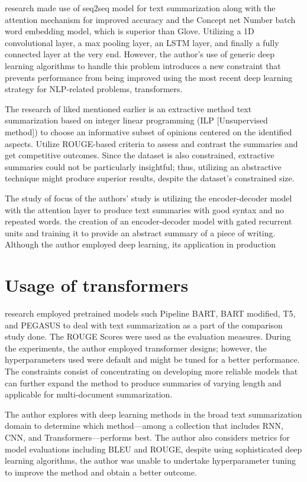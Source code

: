 \documentclass[manuscript,screen,natbib=false]{acmart}
\begin{document}
\cite{brasoveanu_andonie_2020} research made use of seq2seq model for text summarization along with the attention mechanism for improved accuracy and the Concept net Number batch word embedding model, which is superior than Glove. Utilizing a 1D convolutional layer, a max pooling layer, an LSTM layer, and finally a fully connected layer at the very end. However, the author's use of generic deep learning algorithms to handle this problem introduces a new constraint that prevents performance from being improved using the most recent deep learning strategy for NLP-related problems, transformers.

The research of \cite{mukherjee_peruri_vishnu_goyal_bhattacharya_ganguly_2020} liked mentioned earlier is an extractive method text summarization based on integer linear programming (ILP [Unsupervised method]) to choose an informative subset of opinions centered on the identified aspects. Utilize ROUGE-based criteria to assess and contrast the summaries and get competitive outcomes. Since the dataset is also constrained, extractive summaries could not be particularly insightful; thus, utilizing an abstractive technique might produce superior results, despite the dataset's constrained size.

The study of \cite{etemad_abidi_chhabra_2021} focus of the authors' study is utilizing the encoder-decoder model with the attention layer to produce text summaries with good syntax and no repeated words. the creation of an encoder-decoder model with gated recurrent units and training it to provide an abstract summary of a piece of writing. Although the author employed deep learning, its application in production 

\section{Usage of transformers}
\cite{gupta_lehal_2010} research employed pretrained models such Pipeline BART, BART modified, T5, and PEGASUS to deal with text summarization as a part of the comparison study done. The ROUGE Scores were used as the evaluation measures. During the experiments, the author employed transformer designs; however, the hyperparameters used were default and might be tuned for a better performance. The constraints consist of concentrating on developing more reliable models that can further expand the method to produce summaries of varying length and applicable for multi-document summarization.

\cite{etemad_abidi_chhabra_2021} The author explores with deep learning methods in the broad text summarization domain to determine which method—among a collection that includes RNN, CNN, and Transformers—performs best. The author also considers metrics for model evaluations including BLEU and ROUGE, despite using sophisticated deep learning algorithms, the author was unable to undertake hyperparameter tuning to improve the method and obtain a better outcome.
\end{document}
